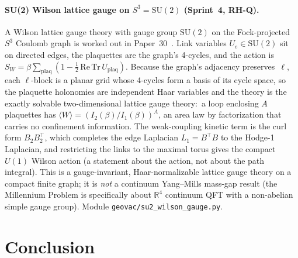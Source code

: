 \documentclass[11pt]{article}
\begin{document}
\paragraph{SU(2) Wilson lattice gauge on $S^3 = \mathrm{SU}(2)$
(Sprint~4, RH-Q).}  A Wilson lattice gauge theory with gauge group
$\mathrm{SU}(2)$ on the Fock-projected $S^3$ Coulomb graph is worked
out in Paper~30~\cite{paper30}.  Link variables $U_e \in
\mathrm{SU}(2)$ sit on directed edges, the plaquettes are the graph's
4-cycles, and the action is
$S_W = \beta \sum_{\mathrm{plaq}} (1 - \tfrac{1}{2}\,\mathrm{Re}\,
\mathrm{Tr}\,U_{\mathrm{plaq}})$.  Because the graph's adjacency
preserves~$\ell$, each $\ell$-block is a planar grid whose 4-cycles form
a basis of its cycle space, so the plaquette holonomies are independent
Haar variables and the theory is the exactly solvable two-dimensional
lattice gauge theory:\ a loop enclosing $A$ plaquettes has
$\langle W \rangle = (I_2(\beta)/I_1(\beta))^{A}$, an area law by
factorization that carries no confinement information.  The
weak-coupling kinetic term is the curl form $B_2 B_2^{\top}$, which
completes the edge Laplacian $L_1 = B^{\top} B$ to the Hodge-1
Laplacian, and restricting the links to the maximal torus gives the
compact $U(1)$ Wilson action (a statement about the action, not about
the path integral).  This is a gauge-invariant, Haar-normalizable
lattice gauge theory on a compact finite graph; it is
\emph{not} a continuum Yang--Mills mass-gap result (the Millennium
Problem is specifically about $\mathbb{R}^4$ continuum QFT with
a non-abelian simple gauge group).  Module
\texttt{geovac/su2\_wilson\_gauge.py}.

\section{Conclusion}
\label{sec:conclusion}
\end{document}
